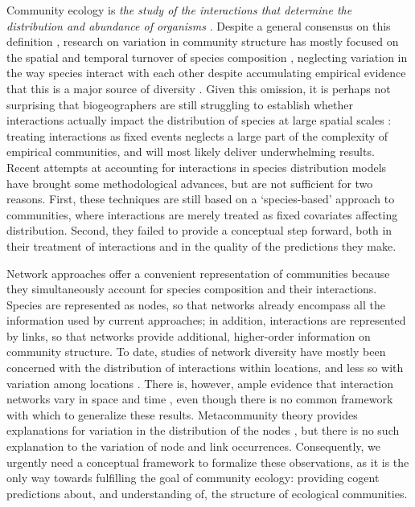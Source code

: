 \documentclass[12pt]{article}
\begin{document}
Community ecology is \textit{the study of the interactions that determine
the distribution and abundance of organisms} \citep{Krebs2001}. Despite a
general consensus on this definition \citep{Scheiner2007a}, research on variation in
community structure has mostly focused on the spatial and temporal turnover
of species composition \citep{Anderson2011}, neglecting variation in the way
species interact with each other despite accumulating empirical evidence that
this is a major source of diversity \citep{Poisot2015a}. Given this omission,
it is perhaps not surprising that biogeographers are still struggling to
establish whether interactions actually impact the distribution of species at
large spatial scales \citep{Wisz2012, Kissling2012}: treating interactions
as fixed events neglects a large part of the complexity of empirical
communities, and will most likely deliver underwhelming results. Recent
attempts at accounting for interactions in species distribution models
\citep{Pollock2014, Pelissier2013} have brought some methodological advances,
but are not sufficient for two reasons. First, these techniques are still
based on a `species-based' approach to communities, where interactions
are merely treated as fixed covariates affecting distribution. Second,
they failed to provide a conceptual step forward, both in their treatment
of interactions and in the quality of the predictions they make.

Network approaches offer a convenient representation of communities because
they simultaneously account for species composition and their interactions.
Species are represented as nodes, so that networks already encompass all the
information used by current approaches; in addition, interactions are
represented by links, so that networks provide additional, higher-order
information on community structure. To date, studies of network diversity have
mostly been concerned with the distribution of interactions within locations,
and less so with variation among locations \citep{Dunne2006, Bascompte2007,
Ings2009, Kefi2012}. There is, however, ample evidence that interaction
networks vary in space and time \citep{Laliberte2010, Poisot2012, Albouy2014,
Poisot2016, Trojelsgaard2015}, even though there is no common framework with
which to generalize these results. Metacommunity theory provides explanations
for variation in the distribution of the nodes \citep{Gravel2011c,
Pillai2011}, but there is no such explanation to the variation of node and
link occurrences. Consequently, we urgently need a conceptual framework to
formalize these observations, as it is the only way towards fulfilling the
goal of community ecology: providing cogent predictions about, and
understanding of, the structure of ecological communities.
\end{document}
